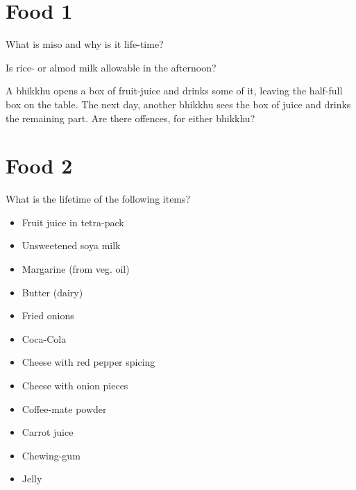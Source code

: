 \section{Food 1}

What is miso and why is it life-time?

Is rice- or almod milk allowable in the afternoon?

A bhikkhu opens a box of fruit-juice and drinks some of it, leaving the
half-full box on the table. The next day, another bhikkhu sees the box of juice
and drinks the remaining part. Are there offences, for either bhikkhu?

\section{Food 2}

What is the lifetime of the following items?

\begin{itemize}
\tightlist
\item
  Fruit juice in tetra-pack
\item
  Unsweetened soya milk
\item
  Margarine (from veg. oil)
\item
  Butter (dairy)
\item
  Fried onions
\item
  Coca-Cola
\item
  Cheese with red pepper spicing
\item
  Cheese with onion pieces
\item
  Coffee-mate powder
\item
  Carrot juice
\item
  Chewing-gum
\item
  Jelly
\end{itemize}

